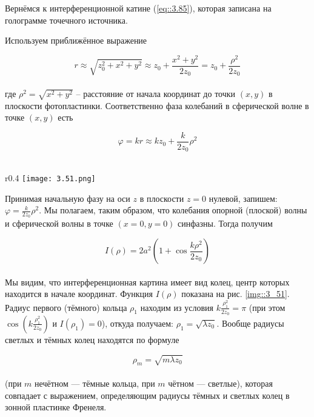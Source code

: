 Вернёмся к интерференционной катине (\ref{eq::3.85}), которая записана на голограмме точечного
источника. 

Используем приближённое выражение

\begin{equation}
r \approx \sqrt{z_0^2 + x^2 + y^2} \approx z_0 + \frac{x^2 + y^2}{2 z_0} = z_0 + \frac{\rho^2}{2 z_0}
\end{equation}
\\
где $\rho^2 = \sqrt{x^2 + y^2}$ -- расстояние от начала координат до точки $(x, y)$ в плоскости
фотопластинки. Соответственно фаза колебаний в сферической волне в точке $(x, y)$ есть

\begin{equation}\label{eq::3.86}
\varphi = k r \approx k z_0 + \frac{k}{2 z_0} \rho^2
\end{equation}
\\
\begin{wrapfigure}{r}{0.4\linewidth}
    \texttt{[image: 3.51.png]}
    \caption{Зависимость $I(\rho)$}
    \label{img::3_51}
\end{wrapfigure}

Принимая начальную фазу на оси $z$ в плоскости $z = 0$ нулевой, запишем:
$\varphi = \frac{k}{2 z_0} \rho^2$. Мы полагаем, таким образом, что колебания опорной (плоской)
волны и сферической волны в точке $(x = 0,y = 0)$ синфазны. Тогда получим

\begin{equation}
    I(\rho) = 2 a^2 \left( 1 + \cos \frac{k \rho^2}{2 z_0} \right)
\end{equation}
\\
Мы видим, что интерференционная картина имеет вид колец, центр которых находится в начале координат. 
Функция $I(\rho)$ показана на рис. \ref{img::3_51}. Радиус первого (тёмного) кольца $\rho_1$
находим из условия $k \frac{\rho_1^2}{2 z_0} = \pi$ (при этом 
$\cos \left( k \frac{\rho_1^2}{2 z_0} \right)$ и $I(\rho_1) = 0$), откуда получаем: 
$\rho_1 = \sqrt{\lambda z_0}$. Вообще радиусы светлых и тёмных колец находятся по формуле

\begin{equation}
    \rho_m  = \sqrt{m \lambda z_0}
\end{equation}
\\
(при $m$ нечётном — тёмные кольца, при $m$ чётном — светлые), которая совпадает с выражением, 
определяющим радиусы тёмных и светлых колец в зонной пластинке Френеля.

